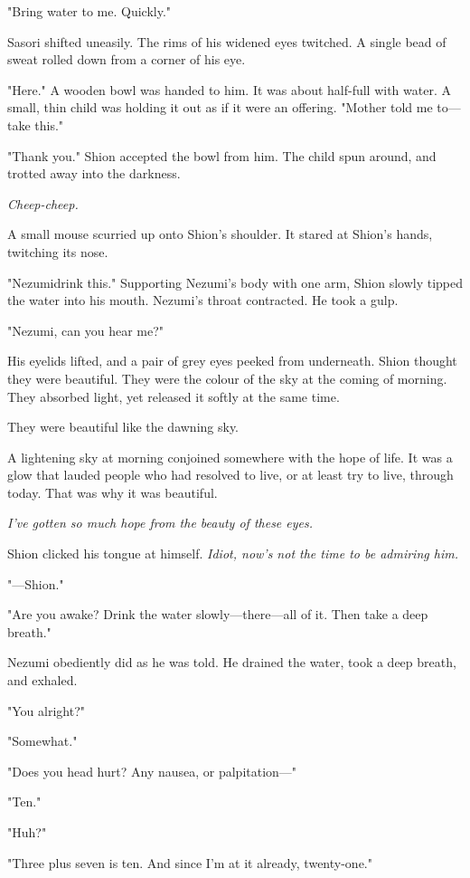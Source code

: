 "Bring water to me. Quickly."

Sasori shifted uneasily. The rims of his widened eyes twitched. A single
bead of sweat rolled down from a corner of his eye.

"Here." A wooden bowl was handed to him. It was about half-full with
water. A small, thin child was holding it out as if it were an offering.
"Mother told me to---take this."

"Thank you." Shion accepted the bowl from him. The child spun around,
and trotted away into the darkness.

\emph{Cheep-cheep.}

A small mouse scurried up onto Shion's shoulder. It stared at Shion's
hands, twitching its nose.

"Nezumi\el drink this." Supporting Nezumi's body with one arm, Shion
slowly tipped the water into his mouth. Nezumi's throat contracted. He
took a gulp.

"Nezumi, can you hear me?"

His eyelids lifted, and a pair of grey eyes peeked from underneath.
Shion thought they were beautiful. They were the colour of the sky at
the coming of morning. They absorbed light, yet released it softly at
the same time.

They were beautiful like the dawning sky.

A lightening sky at morning conjoined somewhere with the hope of life.
It was a glow that lauded people who had resolved to live, or at least
try to live, through today. That was why it was beautiful.

\emph{I've gotten so much hope from the beauty of these eyes.}

Shion clicked his tongue at himself. \emph{Idiot, now's not the time to be
admiring him.}

"---Shion."

"Are you awake? Drink the water slowly---there---all of it. Then take a deep
breath."

Nezumi obediently did as he was told. He drained the water, took a deep
breath, and exhaled.

"You alright?"

"Somewhat."

"Does you head hurt? Any nausea, or palpitation---"

"Ten."

"Huh?"

"Three plus seven is ten. And since I'm at it already, twenty-one."

